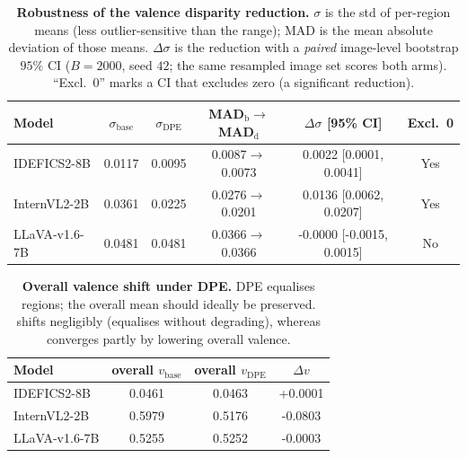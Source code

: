 \begin{table}[t]\centering\small
\caption{\textbf{Robustness of the valence disparity reduction.} $\sigma$ is the std of per-region means (less outlier-sensitive than the range); MAD is the mean absolute deviation of those means. $\Delta\sigma$ is the reduction with a \emph{paired} image-level bootstrap $95\%$ CI ($B{=}2000$, seed $42$; the same resampled image set scores both arms). ``Excl.\ 0'' marks a CI that excludes zero (a significant reduction).}
\label{tab:dpe_robust}
\begin{tabular}{lccccc}
\toprule
Model & $\sigma_{\text{base}}$ & $\sigma_{\text{DPE}}$ & MAD$_{\text{b}}\!\to\!$MAD$_{\text{d}}$ & $\Delta\sigma$ [95\% CI] & Excl.\ 0 \\
\midrule
IDEFICS2-8B & 0.0117 & 0.0095 & 0.0087$\to$0.0073 & 0.0022 [0.0001, 0.0041] & Yes \\
InternVL2-2B & 0.0361 & 0.0225 & 0.0276$\to$0.0201 & 0.0136 [0.0062, 0.0207] & Yes \\
LLaVA-v1.6-7B & 0.0481 & 0.0481 & 0.0366$\to$0.0366 & -0.0000 [-0.0015, 0.0015] & No \\
\bottomrule
\end{tabular}
\end{table}

\begin{table}[t]\centering\small
\caption{\textbf{Overall valence shift under DPE.} DPE equalises regions; the overall mean should ideally be preserved.  shifts negligibly (equalises without degrading), whereas  converges partly by lowering overall valence.}
\label{tab:dpe_overall}
\begin{tabular}{lccc}
\toprule
Model & overall $v_{\text{base}}$ & overall $v_{\text{DPE}}$ & $\Delta v$ \\
\midrule
IDEFICS2-8B & 0.0461 & 0.0463 & +0.0001 \\
InternVL2-2B & 0.5979 & 0.5176 & -0.0803 \\
LLaVA-v1.6-7B & 0.5255 & 0.5252 & -0.0003 \\
\bottomrule
\end{tabular}
\end{table}

